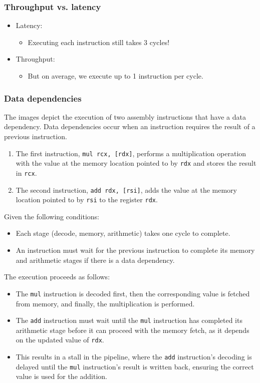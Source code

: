 \documentclass[12pt]{article}
\begin{document}
\subsubsection{Throughput vs. latency}

\begin{itemize}
    \item Latency:
    \begin{itemize}
        \item Executing each instruction still takes 3 cycles!
    \end{itemize}
    \item Throughput:
    \begin{itemize}
        \item But on average, we execute up to 1 instruction per cycle.
    \end{itemize}
\end{itemize}

\subsubsection{Data dependencies}

The images depict the execution of two assembly instructions that have a data dependency. Data dependencies occur when an instruction requires the result of a previous instruction.

\begin{enumerate}
    \item The first instruction, \texttt{mul rcx, [rdx]}, performs a multiplication operation with the value at the memory location pointed to by \texttt{rdx} and stores the result in \texttt{rcx}.
    \item The second instruction, \texttt{add rdx, [rsi]}, adds the value at the memory location pointed to by \texttt{rsi} to the register \texttt{rdx}.
\end{enumerate}

Given the following conditions:
\begin{itemize}
    \item Each stage (decode, memory, arithmetic) takes one cycle to complete.
    \item An instruction must wait for the previous instruction to complete its memory and arithmetic stages if there is a data dependency.
\end{itemize}

The execution proceeds as follows:
\begin{itemize}
    \item The \texttt{mul} instruction is decoded first, then the corresponding value is fetched from memory, and finally, the multiplication is performed.
    \item The \texttt{add} instruction must wait until the \texttt{mul} instruction has completed its arithmetic stage before it can proceed with the memory fetch, as it depends on the updated value of \texttt{rdx}.
    \item This results in a stall in the pipeline, where the \texttt{add} instruction's decoding is delayed until the \texttt{mul} instruction's result is written back, ensuring the correct value is used for the addition.
\end{itemize}
\end{document}
